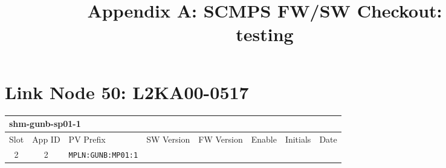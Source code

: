 \documentclass[10pt, oneside]{book}
\title{Appendix A: SCMPS FW/SW Checkout:\\testing}
\date{}
\begin{document}
\maketitle
\addtocounter{page}{1}
\section{Link Node  50: L2KA00-0517}
\begin{table}[H]
\centering
\makegapedcells
\begin{tabularx}{\textwidth}{c c l | c c c c c}
\multicolumn{4}{l}{shm-gunb-sp01-1}\\
\hline
Slot & App ID & PV Prefix & SW Version & FW Version & Enable & Initials & Date\\
\hline
2 & 2 & \texttt{MPLN:GUNB:MP01:1} & & & & & \\
\hline
\end{tabularx}
\end{table}
\end{document}
